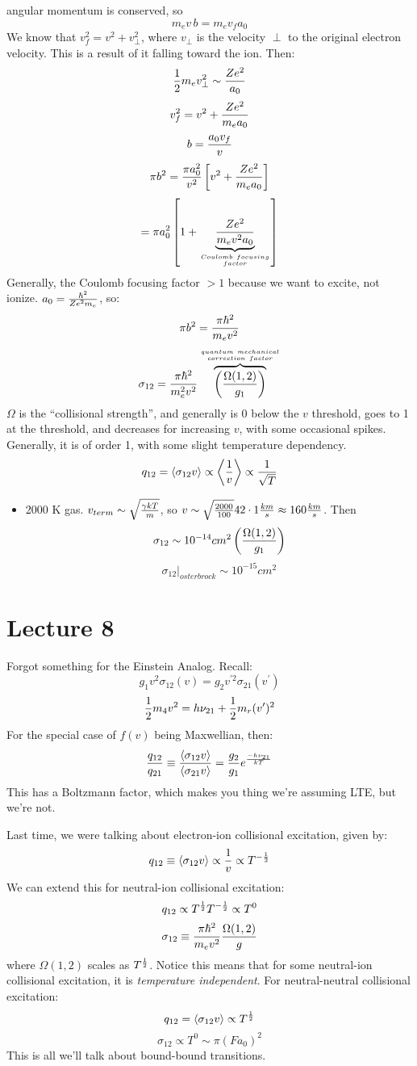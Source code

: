 \documentclass[11pt]{article}
\def\hf{{1 \over 2}}
\def\inv#1{{1 \over #1}}
\def\mean#1{\left\langle #1\right\rangle}
\def\sigot{\sigma_{12}}
\def\eval#1{\big|_{#1}}
\begin{document}
angular momentum is conserved, so 
$$m_ev\,b=m_ev_fa_0$$
We know that $v_f^2 = v^2 + v_\perp^2$, where $v_\perp$ is the velocity
$\perp$ to the original electron velocity.  This is a result of it falling
toward the ion.  Then:
$$\hf m_ev_\perp^2 \sim {Ze^2\over a_0}$$
$$v_f^2 = v^2 + {Ze^2\over m_ea_0}$$
$$b={a_0v_f\over v}$$
$$\pi b^2 = {\pi a_0^2\over v^2}\left[v^2+{Ze^2\over m_ea_0}\right]$$
$$= \pi a_0^2\left[1+\underbrace{Ze^2\over m_ev^2a_0}_{Coulomb\ focusing\atop 
factor}\right]$$
Generally, the Coulomb focusing factor $>1$ because we want to excite, not
ionize.  $a_0={\hbar^2\over Ze^2m_e}$, so:
$$\pi b^2 = {\pi\hbar^2\over m_ev^2}$$
$$\sigot = {\pi\hbar^2\over m_e^2v^2}
\overbrace{\left(\Omega(1,2)\over 
g_1\right)}^{quantum\ mechanical\atop correction\ factor}$$
$\Omega$ is the ``collisional strength'', and generally is 0 below the
$v$ threshold, goes to 1 at the threshold, and decreases for increasing
$v$, with some occasional spikes.  Generally, it is of order 1, with some
slight temperature dependency.
$$\qot=\mean{\sigot v} \propto \mean{\inv{v}} \propto \inv{\sqrt{T}}$$
\begin{itemize}
\item 2000 K gas.  $v_{term} \sim \sqrt{\gamma kT\over m}$, so 
$v\sim \sqrt{2000\over 100}42\cdot 1{km\over s} \approx 160{km\over s}$. Then
$$\sigot \sim 10^{-14}cm^2\left({\Omega(1,2)\over g_1}\right)$$
$$\sigot\eval{osterbrock} \sim 10^{-15} cm^2$$
\end{itemize}

\section*{ Lecture 8 }

Forgot something for the Einstein Analog.  Recall:
$$g_1v^2\sigma_{12}(v)=g_2v^{\prime2}\sigma_{21}(v^\prime)$$
$$\hf m_4v^2=h\nu_{21}+\hf m_r(v^\prime)^2$$
For the special case of $f(v)$ being Maxwellian, then:
$${q_{12}\over q_{21}}\equiv{\mean{\sigma_{12}v}\over\mean{\sigma_{21}v}}
={g_2\over g_1}e^{-h\nu_{21}\over kT}$$
This has a Boltzmann factor, which makes you thing we're assuming LTE, but
we're not. \par
Last time, we were talking about electron-ion collisional excitation, given by:
$$\qot\equiv\mean{\sigot v}\propto\inv{v}\propto T^{-\hf}$$
We can extend this for neutral-ion collisional excitation:
$$\qot \propto T^\hf T^{-\hf} \propto T^0$$
$$\sigot\equiv{\pi\hbar^2\over m_ev^2}{\Omega(1,2)\over g}$$
where $\Omega(1,2)$ scales as $T^\hf$.  Notice this means that for some
neutral-ion collisional excitation, it is {\it temperature independent}.
For neutral-neutral collisional excitation:
$$\qot=\mean{\sigot v}\propto T^\hf$$
$$\sigot\propto T^0\sim \pi(Fa_0)^2$$
This is all we'll talk about bound-bound transitions.
\end{document}
